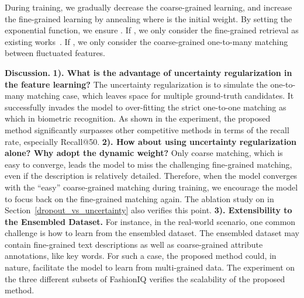 \documentclass[10pt,twocolumn,letterpaper]{article}
\begin{document}
During training, we gradually decrease the coarse-grained learning, and increase the fine-grained learning by annealing 
where  is the initial weight. By setting the exponential function, we ensure . 
If , we only consider the fine-grained retrieval as existing works~\cite{2021CoSMo}. If , we only consider the coarse-grained one-to-many matching between fluctuated features.







\noindent\textbf{Discussion.} 
\textbf{1). What is the advantage of uncertainty regularization in the feature learning?} The uncertainty regularization is to simulate the one-to-many matching case, which leaves space for multiple ground-truth candidates. It successfully invades the model to over-fitting the strict one-to-one matching as which in biometric recognition. As shown in the experiment, the proposed method significantly surpasses other competitive methods in terms of the recall rate, especially Recall@50.
\textbf{2). How about using uncertainty regularization alone?  Why adopt the dynamic weight?} Only coarse matching, which is easy to converge, leads the model to miss the challenging fine-grained matching, even if the description is relatively detailed. 
Therefore, when the model converges with the ``easy'' coarse-grained matching during training, we encourage the model to focus back on the fine-grained matching again. The ablation study on  in Section~\ref{dropout_vs_uncertainty} also verifies this point.
\textbf{3). Extensibility to the Ensembled Dataset.}  
For instance, in the real-world scenario, one common challenge is how to learn from the ensembled dataset. The ensembled dataset may contain fine-grained text descriptions as well as coarse-grained attribute annotations, like key words. 
For such a case, the proposed method could, in nature, facilitate the model to learn from multi-grained data. The experiment on the three different subsets of FashionIQ verifies the scalability of the proposed method.
\end{document}
